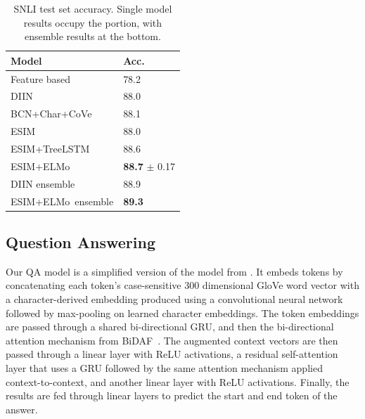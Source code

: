 \documentclass[11pt,a4paper]{article}
\newcommand{\ELMO}{ELMo}
\begin{document}
\begin{table}
\centering
\begin{tabular}{l|l}
\textbf{Model}                                                 & \textbf{Acc.} \\ \hline \hline
Feature based \citep{snliemnlp2015}                & 78.2                                                    \\
DIIN \citep{Gong2017NaturalLI}                      & 88.0                                                    \\
BCN+Char+CoVe \citep{McCann2017LearnedIT}       & 88.1                                                    \\
ESIM \citep{Chen2017EnhancedLF}                     & 88.0                                                    \\
ESIM+TreeLSTM \citep{Chen2017EnhancedLF} & 88.6                                                    \\
ESIM+\ELMO                                          & \textbf{88.7} $\pm$ 0.17                                           \\ \hline

DIIN ensemble \citep{Gong2017NaturalLI}             & 88.9                                                    \\
ESIM+\ELMO~ensemble                                 & \textbf{89.3}                                          
\end{tabular}
\caption{SNLI test set accuracy.\protect\footnotemark
Single model results occupy the portion, with ensemble results at the bottom.
}
\label{table:snli_test}
\end{table}


\subsection{Question Answering}
Our QA model is a simplified version of the model from \citet{ClarkAdvancingRC}. It embeds tokens by concatenating each token's case-sensitive 300 dimensional GloVe word vector \citep{Pennington2014GloveGV} with a character-derived embedding produced using a convolutional neural network followed by max-pooling on learned character embeddings. The token embeddings are passed through a shared bi-directional GRU, and then the bi-directional attention mechanism from BiDAF~\cite{Seo2016BidirectionalAF}. The augmented context vectors are then passed through a linear layer with ReLU activations, a residual self-attention layer that uses a GRU followed by the same attention mechanism applied context-to-context, and another linear layer with ReLU activations. Finally, the results are fed through linear layers to predict the start and end token of the answer. 
\end{document}
